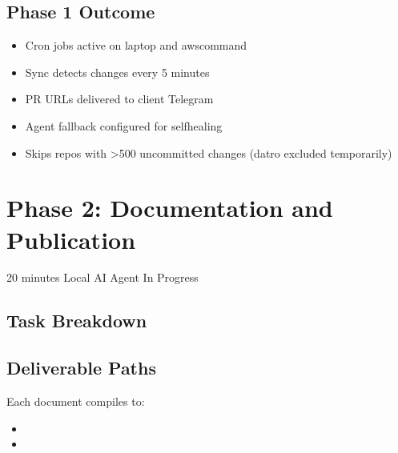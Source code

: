 \documentclass[letterpaper,10pt,openany,oneside,english]{sphinxmanual}
\begin{document}
\subsection{Phase 1 Outcome}
\label{\detokenize{phase1:phase-1-outcome}}\begin{itemize}
\item {} 
\sphinxAtStartPar
Cron jobs active on laptop and aws\sphinxhyphen{}command

\item {} 
\sphinxAtStartPar
Sync detects changes every 5 minutes

\item {} 
\sphinxAtStartPar
PR URLs delivered to client Telegram

\item {} 
\sphinxAtStartPar
Agent fallback configured for self\sphinxhyphen{}healing

\item {} 
\sphinxAtStartPar
Skips repos with \textgreater{}500 uncommitted changes (datro excluded temporarily)

\end{itemize}

\sphinxstepscope


\section{Phase 2: Documentation and Publication}
\label{\detokenize{phase2:phase-2-documentation-and-publication}}\label{\detokenize{phase2::doc}}
\sphinxAtStartPar
{} 20 minutes
 Local AI Agent
 In Progress


\subsection{Task Breakdown}
\label{\detokenize{phase2:task-breakdown}}

\subsection{Deliverable Paths}
\label{\detokenize{phase2:deliverable-paths}}
\sphinxAtStartPar
Each document compiles to:
\begin{itemize}
\item {} 
\sphinxAtStartPar
{} 

\item {} 
\sphinxAtStartPar
{} 

\end{itemize}
\end{document}
